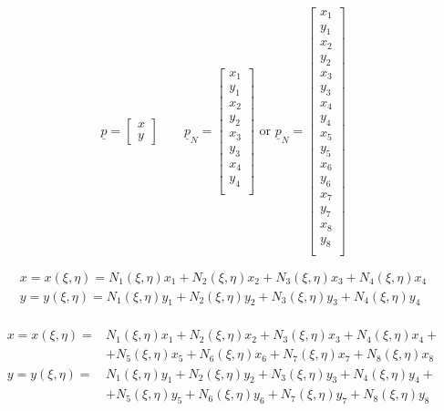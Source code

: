 \documentclass[a4paper]{jpconf}
\begin{document}
\begin{equation}
\underline{p}=\begin{bmatrix}
x\\y
\end{bmatrix}\qquad\underline{p}_{N}=\begin{bmatrix}
x_{1}\\y_{1}\\x_{2}\\y_{2}\\x_{3}\\y_{3}\\x_{4}\\y_{4}\\
\end{bmatrix}\text{ or }\underline{p}_{N}=\begin{bmatrix}
x_{1}\\y_{1}\\x_{2}\\y_{2}\\x_{3}\\y_{3}\\x_{4}\\y_{4}\\x_{5}\\y_{5}\\x_{6}\\y_{6}\\x_{7}\\y_{7}\\x_{8}\\y_{8}\\
\end{bmatrix}
\end{equation}

\begin{equation}
\begin{split}
x = x\left(\xi,\eta\right) = N_{1}\left(\xi,\eta\right)x_{1}+N_{2}\left(\xi,\eta\right)x_{2}+N_{3}\left(\xi,\eta\right)x_{3}+N_{4}\left(\xi,\eta\right)x_{4}\\
y = y\left(\xi,\eta\right) = N_{1}\left(\xi,\eta\right)y_{1}+N_{2}\left(\xi,\eta\right)y_{2}+N_{3}\left(\xi,\eta\right)y_{3}+N_{4}\left(\xi,\eta\right)y_{4}\\
\end{split}
\end{equation}

\begin{equation}
\begin{split}
x = x\left(\xi,\eta\right) =& N_{1}\left(\xi,\eta\right)x_{1}+N_{2}\left(\xi,\eta\right)x_{2}+N_{3}\left(\xi,\eta\right)x_{3}+N_{4}\left(\xi,\eta\right)x_{4}+\\
& +N_{5}\left(\xi,\eta\right)x_{5}+N_{6}\left(\xi,\eta\right)x_{6}+N_{7}\left(\xi,\eta\right)x_{7}+N_{8}\left(\xi,\eta\right)x_{8}\\
y = y\left(\xi,\eta\right) =& N_{1}\left(\xi,\eta\right)y_{1}+N_{2}\left(\xi,\eta\right)y_{2}+N_{3}\left(\xi,\eta\right)y_{3}+N_{4}\left(\xi,\eta\right)y_{4}+\\
& +N_{5}\left(\xi,\eta\right)y_{5}+N_{6}\left(\xi,\eta\right)y_{6}+N_{7}\left(\xi,\eta\right)y_{7}+N_{8}\left(\xi,\eta\right)y_{8}\\
\end{split}
\end{equation}
\end{document}
